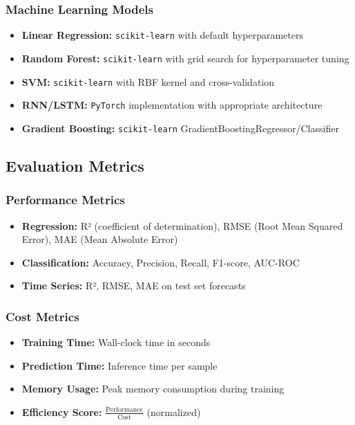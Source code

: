 \documentclass[11pt,a4paper]{article}
\begin{document}
\subsubsection{Machine Learning Models}

\begin{itemize}
    \item \textbf{Linear Regression:} \texttt{scikit-learn} with default hyperparameters
    \item \textbf{Random Forest:} \texttt{scikit-learn} with grid search for hyperparameter tuning
    \item \textbf{SVM:} \texttt{scikit-learn} with RBF kernel and cross-validation
    \item \textbf{RNN/LSTM:} \texttt{PyTorch} implementation with appropriate architecture
    \item \textbf{Gradient Boosting:} \texttt{scikit-learn} GradientBoostingRegressor/Classifier
\end{itemize}

\subsection{Evaluation Metrics}

\subsubsection{Performance Metrics}

\begin{itemize}
    \item \textbf{Regression:} R² (coefficient of determination), RMSE (Root Mean Squared Error), MAE (Mean Absolute Error)
    \item \textbf{Classification:} Accuracy, Precision, Recall, F1-score, AUC-ROC
    \item \textbf{Time Series:} R², RMSE, MAE on test set forecasts
\end{itemize}

\subsubsection{Cost Metrics}

\begin{itemize}
    \item \textbf{Training Time:} Wall-clock time in seconds
    \item \textbf{Prediction Time:} Inference time per sample
    \item \textbf{Memory Usage:} Peak memory consumption during training
    \item \textbf{Efficiency Score:} $\frac{\text{Performance}}{\text{Cost}}$ (normalized)
\end{itemize}
\end{document}

